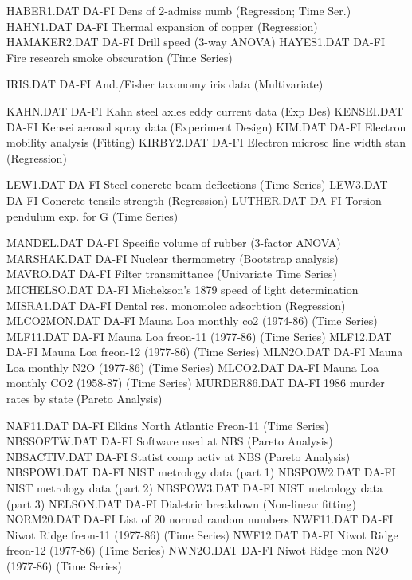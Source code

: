 HABER1.DAT                  DA-FI Dens of 2-admiss numb (Regression; Time Ser.)
HAHN1.DAT                   DA-FI Thermal expansion of copper (Regression)
HAMAKER2.DAT                DA-FI Drill speed (3-way ANOVA)
HAYES1.DAT                  DA-FI Fire research smoke obscuration (Time Series)

IRIS.DAT                    DA-FI And./Fisher taxonomy iris data (Multivariate)

KAHN.DAT                    DA-FI Kahn steel axles eddy current data (Exp Des)
KENSEI.DAT                  DA-FI Kensei aerosol spray data (Experiment Design)
KIM.DAT                     DA-FI Electron mobility analysis (Fitting)
KIRBY2.DAT                  DA-FI Electron microsc line width stan (Regression)

LEW1.DAT                    DA-FI Steel-concrete beam deflections (Time Series)
LEW3.DAT                    DA-FI Concrete tensile strength (Regression)
LUTHER.DAT                  DA-FI Torsion pendulum exp. for G (Time Series)

MANDEL.DAT                  DA-FI Specific volume of rubber (3-factor ANOVA)
MARSHAK.DAT                 DA-FI Nuclear thermometry (Bootstrap analysis)
MAVRO.DAT                   DA-FI Filter transmittance (Univariate Time Series)
MICHELSO.DAT                DA-FI Michekson's 1879 speed of light determination
MISRA1.DAT                  DA-FI Dental res. monomolec adsorbtion (Regression)
MLCO2MON.DAT                DA-FI Mauna Loa monthly co2 (1974-86) (Time Series)
MLF11.DAT                   DA-FI Mauna Loa freon-11 (1977-86) (Time Series)
MLF12.DAT                   DA-FI Mauna Loa freon-12 (1977-86) (Time Series)
MLN2O.DAT                   DA-FI Mauna Loa monthly N2O (1977-86) (Time Series)
MLCO2.DAT                   DA-FI Mauna Loa monthly CO2 (1958-87) (Time Series)
MURDER86.DAT                DA-FI 1986 murder rates by state (Pareto Analysis)

NAF11.DAT                   DA-FI Elkins North Atlantic Freon-11 (Time Series)
NBSSOFTW.DAT                DA-FI Software used at NBS (Pareto Analysis)
NBSACTIV.DAT                DA-FI Statist comp activ at NBS (Pareto Analysis)
NBSPOW1.DAT                 DA-FI NIST metrology data (part 1)
NBSPOW2.DAT                 DA-FI NIST metrology data (part 2)
NBSPOW3.DAT                 DA-FI NIST metrology data (part 3)
NELSON.DAT                  DA-FI Dialetric breakdown (Non-linear fitting)
NORM20.DAT                  DA-FI List of 20 normal random numbers
NWF11.DAT                   DA-FI Niwot Ridge freon-11 (1977-86) (Time Series)
NWF12.DAT                   DA-FI Niwot Ridge freon-12 (1977-86) (Time Series)
NWN2O.DAT                   DA-FI Niwot Ridge mon N2O (1977-86) (Time Series)

